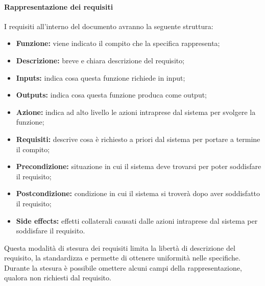\paragraph{Rappresentazione dei requisiti}
I requisiti all'interno del documento avranno la seguente struttura:
\begin{itemize}
	\item \textbf{Funzione:} viene indicato il compito che la specifica rappresenta; 
	\item \textbf{Descrizione:} breve e chiara descrizione del requisito;
	\item \textbf{Inputs:} indica cosa questa funzione richiede in input;
	\item \textbf{Outputs:} indica cosa questa funzione produca come output;
	\item \textbf{Azione:} indica ad alto livello le azioni intraprese dal sistema per svolgere la funzione;
	\item \textbf{Requisiti:} descrive cosa è richiesto a priori dal sistema per portare a termine il compito;
	\item \textbf{Precondizione:} situazione in cui il sistema deve trovarsi per poter soddisfare il requisito;
	\item \textbf{Postcondizione:} condizione in cui il sistema si troverà dopo aver soddisfatto il requisito;
	\item \textbf{Side effects:} effetti collaterali causati dalle azioni intraprese dal sistema per soddisfare il requisito.
\end{itemize}
Questa modalità di stesura dei requisiti limita la libertà di descrizione del requisito, la standardizza e permette di ottenere uniformità nelle specifiche.\\
Durante la stesura è possibile omettere alcuni campi della rappresentazione, qualora non richiesti dal requisito.



